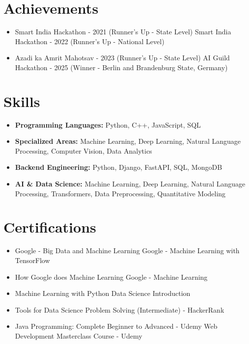 \documentclass[a4paper,10pt]{article}
\begin{document}
\section*{Achievements}
\begin{itemize}
\item Smart India Hackathon - 2021 (Runner's Up - State Level) \hfill Smart India Hackathon - 2022 (Runner's Up - National Level)
\item Azadi ka Amrit Mahotsav - 2023 (Runner's Up - State Level) \hfill AI Guild Hackathon - 2025 (Winner - Berlin and Brandenburg State, Germany)
\end{itemize}

\section*{Skills}
\begin{itemize}
  \item \textbf{Programming Languages:} Python, C++, JavaScript, SQL
  \item \textbf{Specialized Areas:} Machine Learning, Deep Learning, Natural Language Processing, Computer Vision, Data Analytics
  \item \textbf{Backend Engineering:} Python, Django, FastAPI, SQL, MongoDB
  \item \textbf{AI \& Data Science:} Machine Learning, Deep Learning, Natural Language Processing, Transformers, Data Preprocessing, Quantitative Modeling
\end{itemize}

\section*{Certifications}
\begin{itemize}
\item Google - Big Data and Machine Learning \hfill Google - Machine Learning with TensorFlow
\item How Google does Machine Learning \hfill Google - Machine Learning
\item Machine Learning with Python \hfill Data Science Introduction
\item Tools for Data Science \hfill Problem Solving (Intermediate) - HackerRank
\item Java Programming: Complete Beginner to Advanced - Udemy \hfill Web Development Masterclass Course - Udemy
\end{itemize}
\end{document}
